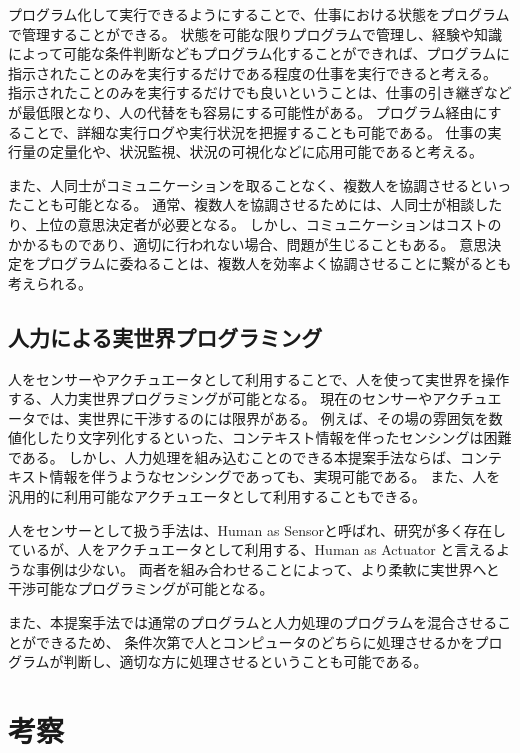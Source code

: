 \documentclass[twoside]{wiss}
\begin{document}
プログラム化して実行できるようにすることで、仕事における状態をプログラムで管理することができる。
状態を可能な限りプログラムで管理し、経験や知識によって可能な条件判断などもプログラム化することができれば、プログラムに指示されたことのみを実行するだけである程度の仕事を実行できると考える。
指示されたことのみを実行するだけでも良いということは、仕事の引き継ぎなどが最低限となり、人の代替をも容易にする可能性がある。
プログラム経由にすることで、詳細な実行ログや実行状況を把握することも可能である。
仕事の実行量の定量化や、状況監視、状況の可視化などに応用可能であると考える。

また、人同士がコミュニケーションを取ることなく、複数人を協調させるといったことも可能となる。
通常、複数人を協調させるためには、人同士が相談したり、上位の意思決定者が必要となる。
しかし、コミュニケーションはコストのかかるものであり、適切に行われない場合、問題が生じることもある。
意思決定をプログラムに委ねることは、複数人を効率よく協調させることに繋がるとも考えられる。


\subsection{人力による実世界プログラミング}

人をセンサーやアクチュエータとして利用することで、人を使って実世界を操作する、人力実世界プログラミングが可能となる。
現在のセンサーやアクチュエータでは、実世界に干渉するのには限界がある。
例えば、その場の雰囲気を数値化したり文字列化するといった、コンテキスト情報を伴ったセンシングは困難である。
しかし、人力処理を組み込むことのできる本提案手法ならば、コンテキスト情報を伴うようなセンシングであっても、実現可能である。
また、人を汎用的に利用可能なアクチュエータとして利用することもできる。

人をセンサーとして扱う手法は、Human as Sensorと呼ばれ、研究が多く存在しているが、人をアクチュエータとして利用する、Human as Actuator と言えるような事例は少ない。
両者を組み合わせることによって、より柔軟に実世界へと干渉可能なプログラミングが可能となる。

また、本提案手法では通常のプログラムと人力処理のプログラムを混合させることができるため、
条件次第で人とコンピュータのどちらに処理させるかをプログラムが判断し、適切な方に処理させるということも可能である。


\section{考察}
\end{document}

